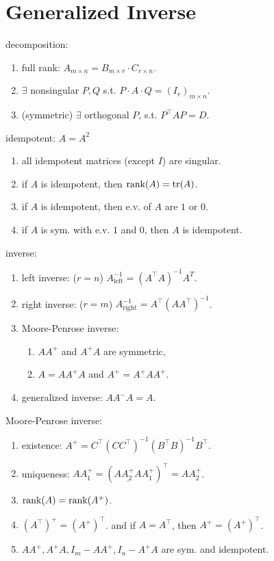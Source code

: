 \section*{Generalized Inverse}

decomposition: \begin{enumerate}
    \item full rank: $A_{m\times n} = B_{m\times r} \cdot C_{r\times n}$.
    \item $\exists$ nonsingular $P, Q$ s.t. $P \cdot A \cdot Q = (I_r)_{m\times n}$.
    \item (symmetric) $\exists$ orthogonal $P$, s.t. $P^\top A P = D$.
\end{enumerate}

idempotent: $A = A^2$ \begin{enumerate}
    \item all idempotent matrices (except $I$) are singular.
    \item if $A$ is idempotent, then $\text{rank}(A) = \text{tr}(A)$.
    \item if $A$ is idempotent, then e.v. of $A$ are $1$ or $0$.
    \item if $A$ is sym. with e.v. $1$ and $0$, then $A$ is idempotent.
\end{enumerate}

inverse: \begin{enumerate}
    \item left inverse: ($r = n$) $A_{\text{left}}^{-1} = (A^\top A)^{-1} A^{T}$.
    \item right inverse: ($r = m$) $A_{\text{right}}^{-1} = A^\top (A A^\top)^{-1}$.
    \item Moore-Penrose inverse: \begin{enumerate}
        \item $A A^+$ and $A^+ A$ are symmetric,
        \item $A = A A^+ A$ and $A^+ = A^+ A A^+$.
    \end{enumerate}
    \item generalized inverse: $A A^- A = A$.
\end{enumerate}

Moore-Penrose inverse: \begin{enumerate}
    \item existence: $A^+ = C^\top(C C^\top)^{-1} (B^\top B)^{-1} B^{\top}$.
    \item uniqueness: $A A^+_1 = (\underline{A A^+_2 A} A^+_1)^\top = A A^+_2$.
    \item $\text{rank}(A) = \text{rank}(A^+)$.
    \item $(A^\top)^+ = (A^+)^\top$. and if $A = A^\top$, then $A^+ = (A^+)^\top$.
    \item $AA^+, A^+A, I_m - AA^+, I_n - A^+A$ are sym. and idempotent.
\end{enumerate}

